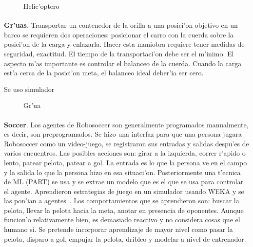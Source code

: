 \documentclass[11pt]{article}
\begin{document}
\begin{figure}[h]

\centering
{}
\caption[Helic'optero]{Helic'optero} 
\label{fig:helicoptero}

\end{figure}

\paragraph{}
\noindent
\textbf{Gr'uas}. Transportar un contenedor de la orilla a una posici'on objetivo en un barco se requieren dos operaciones: posicionar el carro con la cuerda sobre la posici'on de la carga y enlazarla. Hacer esta maniobra requiere tener medidas de seguridad, exactitud. El tiempo de la transportaci'on debe ser el m'inimo. El aspecto m'as importante es controlar el balanceo de la cuerda. Cuando la carga est'a cerca de la posici'on meta, el balanceo ideal deber'ia ser cero.

Se uso simulador~\cite{DBLP:journals/etai/SucB99}

\begin{figure}[h]

\centering
{}
\caption[Gr'ua]{Gr'ua} 
\label{fig:grua}

\end{figure}

\paragraph{}
\noindent
\textbf{Soccer}. Los agentes de Robosoccer son generalmente programados manualmente, es decir, son preprogramados. Se hizo una interfaz para que una persona jugara Robosoccer como un video-juego, se registraron sus entradas y salidas despu'es de varios encuentros. Las posibles acciones son: girar a la izquierda, correr r'apido o lento, patear pelota, patear a gol. La entrada es lo que la persona ve en el campo y la salida lo que la persona hizo en esa situaci'on. Posteriormente una t'ecnica de ML (PART) se usa y se extrae un modelo que es el que se usa para controlar el agente. Aprendieron estrategias de juego en un simulador usando WEKA y se las pon'ian a agentes~\cite{soccerAler}. Los comportamientos que se aprendieron son: buscar la pelota, llevar la pelota hacia la meta, anotar en presencia de oponentes. Aunque funcion'o relativamente bien, es demasiado reactivo y no considera cosas que el humano si. Se pretende incorporar aprendizaje de mayor nivel como pasar la pelota, disparo a gol, empujar la pelota, dribleo y modelar a nivel de entrenador.
\end{document}
